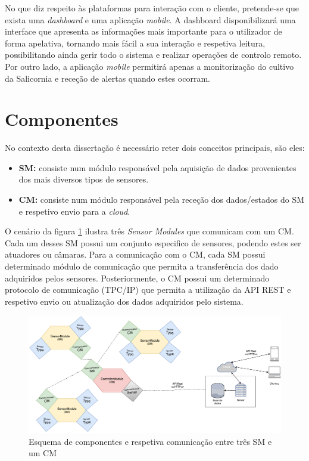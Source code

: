No que diz respeito às plataformas para interação com o cliente, pretende-se que exista uma \textit{dashboard} e uma aplicação \textit{mobile}. A dashboard disponibilizará  uma interface que apresenta as informações mais importante para o utilizador de forma apelativa, tornando mais fácil a sua interação e respetiva leitura, possibilitando ainda gerir todo o sistema e realizar operações de controlo remoto. Por outro lado, a aplicação \textit{mobile} permitirá apenas a monitorização do cultivo da Salicornia e receção de alertas quando estes ocorram.




\section{Componentes}

No contexto desta dissertação é necessário reter dois conceitos principais, são eles: 

\begin{itemize}
	\item \textbf{\acl{SM}:} consiste num módulo responsável pela aquisição de dados provenientes dos mais diversos tipos de sensores. 
	
	
	\item \textbf{\acl{CM}:} consiste num módulo responsável pela receção dos dados/estados do \acl{SM} e respetivo envio para a \textit{cloud}.  
	
\end{itemize}


O cenário da figura \ref{esquema1} ilustra três \textit{Sensor Modules} que comunicam com um \acl{CM}. Cada um desses \acl{SM} possui um conjunto especifico de sensores, podendo estes ser atuadores ou câmaras. Para a comunicação com o \acl{CM}, cada \acl{SM} possui determinado módulo de comunicação que permita a transferência dos dado adquiridos pelos sensores. Posteriormente, o \acl{CM} possui um determinado protocolo de comunicação (TPC/IP) que permita a utilização da API REST e respetivo envio ou atualização dos dados adquiridos pelo sistema. 



\begin{figure}[h]
	\centering
	\includegraphics[scale=0.3]{esquemas/general-electronic-modules.pdf}
	\caption{Esquema de componentes e respetiva comunicação entre três \ac{SM} e um \ac{CM}}
	\label{esquema1}
\end{figure}


